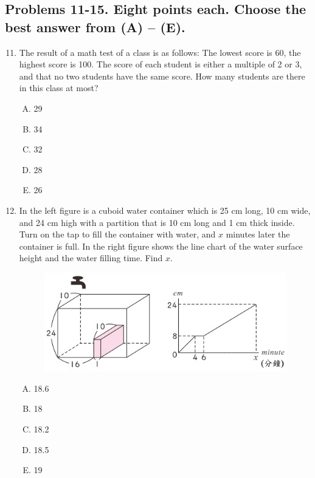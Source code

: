 \documentclass[12pt]{scrartcl}
\begin{document}
\subsection*{Problems 11-15. Eight points each. Choose the best answer from (A) -- (E).}
\hrulefill
\begin{enumerate}\setcounter{enumi}{10}
    \item The result of a math test of a class is as follows: The lowest score is 60, the highest score is 100. The score of each student is either a multiple of 2 or 3, and that no two students have the same score. How many students are there in this class at most?
    \begin{multicols}{5}
        \begin{enumerate}[(A)]
            \item 29
            \item 34
            \item 32
            \item 28
            \item 26
        \end{enumerate}
    \end{multicols} \hrulefill

    \newpage
    \item In the left figure is a cuboid water container which is 25 cm long, 10 cm wide, and 24 cm high with a partition that is 10 cm long and 1 cm thick inside. Turn on the tap to fill the container with water, and $x$ minutes later the container is full. In the right figure shows the line chart of the water surface height and the water filling time. Find $x$.
    \begin{figure}[h]
        \centering
        \includegraphics[scale=0.4]{StarGen/0Figure/wmi2023G6A-num11.png}
    \end{figure}
    \begin{multicols}{5}
        \begin{enumerate}[(A)]
            \item 18.6
            \item 18
            \item 18.2
            \item 18.5
            \item 19
        \end{enumerate}
    \end{multicols} \hrulefill


\end{enumerate}
\end{document}
